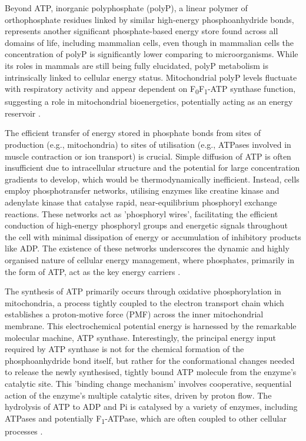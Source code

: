 Beyond ATP, inorganic polyphosphate (polyP), a linear polymer of orthophosphate residues linked by similar high-energy phosphoanhydride bonds, represents another significant phosphate-based energy store found across all domains of life, including mammalian cells, even though in mammalian cells the concentration of polyP is significantly lower comparing to microorganisms. While its roles in mammals are still being fully elucidated, polyP metabolism is intrinsically linked to cellular energy status. Mitochondrial polyP levels fluctuate with respiratory activity and appear dependent on F\textsubscript{0}F\textsubscript{1}-ATP synthase function, suggesting a role in mitochondrial bioenergetics, potentially acting as an energy reservoir \citep{pavlovInorganicPolyphosphateEnergy2010}.

The efficient transfer of energy stored in phosphate bonds from sites of production (e.g., mitochondria) to sites of utilisation (e.g., ATPases involved in muscle contraction or ion transport) is crucial. Simple diffusion of ATP is often insufficient due to intracellular structure and the potential for large concentration gradients to develop, which would be thermodynamically inefficient. Instead, cells employ phosphotransfer networks, utilising enzymes like creatine kinase and adenylate kinase that catalyse rapid, near-equilibrium phosphoryl exchange reactions. These networks act as 'phosphoryl wires', facilitating the efficient conduction of high-energy phosphoryl groups and energetic signals throughout the cell with minimal dissipation of energy or accumulation of inhibitory products like ADP. The existence of these networks underscores the dynamic and highly organised nature of cellular energy management, where phosphates, primarily in the form of ATP, act as the key energy carriers \citep{dzejaPhosphotransferNetworksCellular2003}.

The synthesis of ATP primarily occurs through oxidative phosphorylation in mitochondria, a process tightly coupled to the electron transport chain which establishes a proton-motive force (PMF) across the inner mitochondrial membrane. This electrochemical potential energy is harnessed by the remarkable molecular machine, ATP synthase. Interestingly, the principal energy input required by ATP synthase is not for the chemical formation of the phosphoanhydride bond itself, but rather for the conformational changes needed to release the newly synthesised, tightly bound ATP molecule from the enzyme's catalytic site. This 'binding change mechanism' involves cooperative, sequential action of the enzyme's multiple catalytic sites, driven by proton flow. The hydrolysis of ATP to ADP and Pi is catalysed by a variety of enzymes, including ATPases and potentially F\textsubscript{1}-ATPase, which are often coupled to other cellular processes \citep{boyerEnergyLifeATP1998}.

